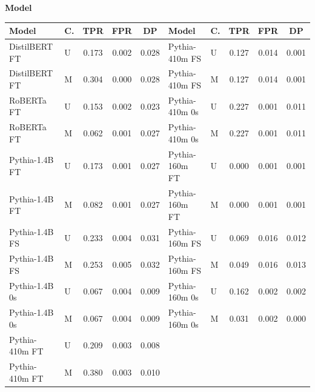 \documentclass[11pt]{article}
\begin{document}
\vspace{4pt}\noindent\textbf{Model}
\begin{center}\scriptsize
\begin{tabular}{llccc|llccc}
\toprule
\textbf{Model} & \textbf{C.} & \textbf{TPR} & \textbf{FPR} & \textbf{DP} & \textbf{Model} & \textbf{C.} & \textbf{TPR} & \textbf{FPR} & \textbf{DP} \\
\midrule
DistilBERT FT & U & 0.173 & 0.002 & 0.028 & Pythia-410m FS & U & 0.127 & 0.014 & 0.001 \\
DistilBERT FT & M & 0.304 & 0.000 & 0.028 & Pythia-410m FS & M & 0.127 & 0.014 & 0.001 \\
RoBERTa FT & U & 0.153 & 0.002 & 0.023 & Pythia-410m 0s & U & 0.227 & 0.001 & 0.011 \\
RoBERTa FT & M & 0.062 & 0.001 & 0.027 & Pythia-410m 0s & M & 0.227 & 0.001 & 0.011 \\
Pythia-1.4B FT & U & 0.173 & 0.001 & 0.027 & Pythia-160m FT & U & 0.000 & 0.001 & 0.001 \\
Pythia-1.4B FT & M & 0.082 & 0.001 & 0.027 & Pythia-160m FT & M & 0.000 & 0.001 & 0.001 \\
Pythia-1.4B FS & U & 0.233 & 0.004 & 0.031 & Pythia-160m FS & U & 0.069 & 0.016 & 0.012 \\
Pythia-1.4B FS & M & 0.253 & 0.005 & 0.032 & Pythia-160m FS & M & 0.049 & 0.016 & 0.013 \\
Pythia-1.4B 0s & U & 0.067 & 0.004 & 0.009 & Pythia-160m 0s & U & 0.162 & 0.002 & 0.002 \\
Pythia-1.4B 0s & M & 0.067 & 0.004 & 0.009 & Pythia-160m 0s & M & 0.031 & 0.002 & 0.000 \\
Pythia-410m FT & U & 0.209 & 0.003 & 0.008 & & & & & \\
Pythia-410m FT & M & 0.380 & 0.003 & 0.010 & & & & & \\
\bottomrule
\end{tabular}
\end{center}
\end{document}
